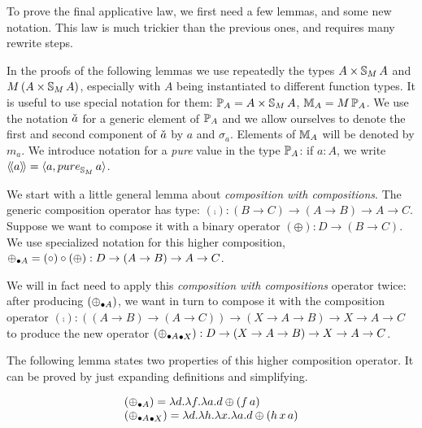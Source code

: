 To prove the final applicative law, we first need a few lemmas, and some new notation.
This law is much trickier than the previous ones, and requires many rewrite steps.

In the proofs of the following lemmas we use repeatedly the types $A\times \mathbb{S}_{M}\,A$ and $M\,(A\times \mathbb{S}_{M}\,A)$, especially with $A$ being instantiated to different function types.
It is useful to use special notation for them:
$\mathbb{P}_{A} = A\times \mathbb{S}_{M}\,A$, $\mathbb{M}_{A} = M\,\mathbb{P}_{A}$.
We use the notation $\check{a}$ for a generic element of $\mathbb{P}_{A}$
and we allow ourselves to denote the first and second component of $\check{a}$ by $a$ and $\sigma_a$.
Elements of $\mathbb{M}_{A}$ will be denoted by $m_a$.
We introduce notation for a {\em pure} value in the type $\mathbb{P}_{A}$:
if $a:A$, we write $\ppair{a} = \langle a, \apure_{\stream{M}}\,a \rangle$.

We start with a little general lemma about {\em composition with compositions}.
The generic composition operator has type: $(\comp): (B\rightarrow C) \rightarrow (A\rightarrow B) \rightarrow A \rightarrow C$.
Suppose we want to compose it with a binary operator $(\oplus) : D\rightarrow (B\rightarrow C)$.
We use specialized notation for this higher composition, $\mathbin{\oplus_{\bullet A}} = (\circ) \circ (\oplus) : D \rightarrow (A\rightarrow B) \rightarrow A \rightarrow C$.

We will in fact need to apply this {\em composition with compositions} operator twice: after producing $(\mathbin{\oplus_{\bullet A}})$, we want in turn to compose it with the composition operator $(\comp): ((A\rightarrow B) \rightarrow (A\rightarrow C)) \rightarrow (X\rightarrow A\rightarrow B) \rightarrow X \rightarrow A \rightarrow C$ to produce the new operator $(\mathbin{\mathbin{\oplus_{\bullet A}}_{\bullet X}}): D\rightarrow (X\rightarrow A \rightarrow B) \rightarrow X \rightarrow A \rightarrow C$.

The following lemma states two properties of this higher composition operator.
It can be proved by just expanding definitions and simplifying.
\begin{lemma}\label{lemma:comp_comp}\label{lemma:comp_comp_comp}
$$
\begin{array}{l}
(\mathbin{\oplus_{\bullet A}}) = \lambda d.\lambda f. \lambda a. d\oplus (f\,a) \\
(\mathbin{\mathbin{\oplus_{\bullet A}}_{\bullet X}}) =
\lambda d. \lambda h. \lambda x.\lambda a. d\oplus (h\,x\,a)
\end{array}
$$
\end{lemma}

